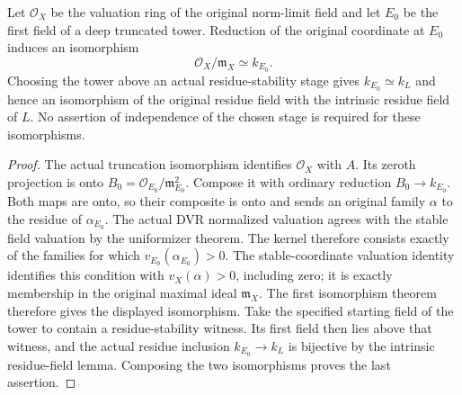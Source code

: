 \begin{lemma}
\label{fw:norm-limit-residue-field}
\leanok
Let $\mathcal O_X$ be the valuation ring of the original norm-limit
field and let $E_0$ be the first field of a deep truncated tower.
Reduction of the original coordinate at $E_0$ induces an isomorphism
\[
 \mathcal O_X/\mathfrak m_X \simeq k_{E_0}.
\]
Choosing the tower above an actual residue-stability stage gives
$k_{E_0}\simeq k_L$ and hence an isomorphism of the original residue
field with the intrinsic residue field of $L$. No assertion of
independence of the chosen stage is required for these isomorphisms.
\end{lemma}
\begin{proof}
The actual truncation isomorphism identifies $\mathcal O_X$ with $A$.
Its zeroth projection is onto
$B_0=\mathcal O_{E_0}/\mathfrak m_{E_0}^2$. Compose it with ordinary
reduction $B_0\to k_{E_0}$. Both maps are onto, so their composite is
onto and sends an original family $\alpha$ to the residue of
$\alpha_{E_0}$. The actual DVR normalized valuation agrees with the stable field valuation
by the uniformizer theorem. The kernel therefore consists exactly of the
families for which $v_{E_0}(\alpha_{E_0})>0$. The stable-coordinate valuation identity
identifies this condition with $v_X(\alpha)>0$, including zero;
it is exactly membership in the original maximal ideal
$\mathfrak m_X$. The first isomorphism theorem therefore gives the
displayed isomorphism. Take the specified starting field of the tower
to contain a residue-stability witness. Its first field then lies
above that witness, and the actual residue inclusion
$k_{E_0}\to k_L$ is bijective by the intrinsic residue-field lemma.
Composing the two isomorphisms proves the last assertion.
\end{proof}

